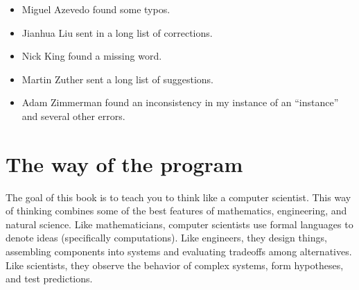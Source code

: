 \documentclass[10pt]{book}
\begin{document}
\begin{itemize}

\item Miguel Azevedo found some typos.


\item Jianhua Liu sent in a long list of corrections.


\item Nick King found a missing word.


\item Martin Zuther sent a long list of suggestions.


\item Adam Zimmerman found an inconsistency in my instance
of an ``instance'' and several other errors.



\end{itemize}

\normalsize

\clearemptydoublepage

\begin{latexonly}

\tableofcontents

\clearemptydoublepage

\end{latexonly}

\mainmatter


\chapter{The way of the program}

The goal of this book is to teach you to think like a
computer scientist.  This way of thinking combines some of the best features
of mathematics, engineering, and natural science.  Like mathematicians,
computer scientists use formal languages to denote ideas (specifically
computations).  Like engineers, they design things, assembling components
into systems and evaluating tradeoffs among alternatives.  Like scientists,
they observe the behavior of complex systems, form hypotheses, and test
predictions.

\end{document}
